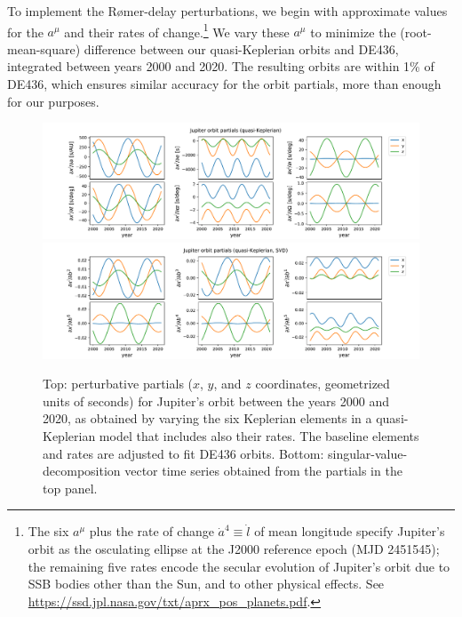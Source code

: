 \documentclass[iop,apj,twocolappendix]{emulateapj}
\begin{document}
\begin{itemize}
To implement the R{\o}mer-delay perturbations, we begin with approximate values for the $a^\mu$ and their rates of change.\footnote{The six $a^\mu$ plus the rate of change $\dot{a}^4 \equiv \dot{l}$ of mean longitude specify Jupiter's orbit as the osculating ellipse at the J2000 reference epoch (MJD 2451545); the remaining five rates encode the secular evolution of Jupiter's orbit due to SSB bodies other than the Sun, and to other physical effects. See \href{https://ssd.jpl.nasa.gov/txt/aprx_pos_planets.pdf}{https://ssd.jpl.nasa.gov/txt/aprx\_pos\_planets.pdf}.}
We vary these $a^\mu$ to minimize the (root-mean-square) difference between our quasi-Keplerian orbits and DE436, integrated between years 2000 and 2020. The resulting orbits are within 1\% of DE436, which ensures similar accuracy for the orbit partials, more than enough for our purposes.
%
\begin{figure}[t]
    \centering
    \includegraphics[width=2\columnwidth]{figures/JupiterPartials.pdf}
    \includegraphics[width=2\columnwidth]{figures/JupiterPartialsSVD.pdf}
    \caption{Top: perturbative partials ($x$, $y$, and $z$ coordinates, geometrized units of seconds) for Jupiter's orbit between the years 2000 and 2020, as obtained by varying the six Keplerian elements in a quasi-Keplerian model that includes also their rates. The baseline elements and rates are adjusted to fit DE436 orbits. Bottom: singular-value-decomposition vector time series obtained from the partials in the top panel.}
    \label{fig:jupiterorbit}
\end{figure}


\end{itemize}
\end{document}
